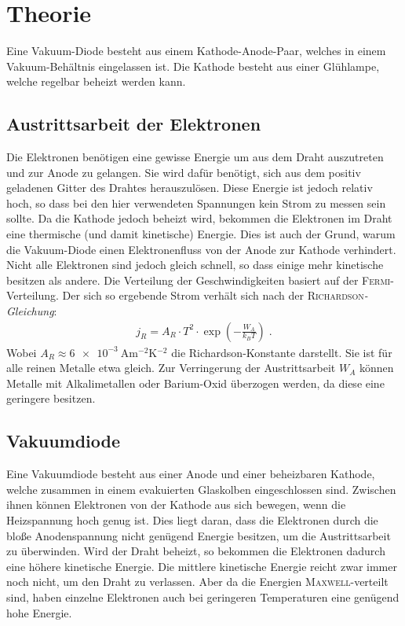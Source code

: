 \documentclass[12pt,a4paper,titlepage,headinclude,bibtotoc]{scrartcl}
\begin{document}
\cite{gerthsen}

\section{Theorie}
\label{sec:theorie}
Eine Vakuum-Diode besteht aus einem Kathode-Anode-Paar, welches in einem Vakuum-Behältnis eingelassen ist.
Die Kathode besteht aus einer Glühlampe, welche regelbar beheizt werden kann.
\subsection{Austrittsarbeit der Elektronen}
Die Elektronen benötigen eine gewisse Energie um aus dem Draht auszutreten und zur Anode zu gelangen.
Sie wird dafür benötigt, sich aus dem positiv geladenen Gitter des Drahtes herauszulösen.
Diese Energie ist jedoch relativ hoch, so dass bei den hier verwendeten Spannungen kein Strom zu messen sein sollte.
Da die Kathode jedoch beheizt wird, bekommen die Elektronen im Draht eine thermische (und damit kinetische) Energie.
Dies ist auch der Grund, warum die Vakuum-Diode einen Elektronenfluss von der Anode zur Kathode verhindert.
Nicht alle Elektronen sind jedoch gleich schnell, so dass einige mehr kinetische besitzen als andere.
Die Verteilung der Geschwindigkeiten basiert auf der \textsc{Fermi}-Verteilung.
Der sich so ergebende Strom verhält sich nach der \textsc{Richardson}\emph{-Gleichung}:
\begin{align}
	j_R=A_R\cdot T^{2}\cdot \exp\left(-\frac{W_A}{k_BT}\right)\label{eq:richardson}\; .
\end{align}
Wobei $A_R\approx \SI{6e-3}{\ampere\meter^{-2}\kelvin^{-2}}$ die Richardson-Konstante darstellt.
Sie ist für alle reinen Metalle etwa gleich.
Zur Verringerung der Austrittsarbeit $W_A$ können Metalle mit Alkalimetallen oder Barium-Oxid überzogen werden, da diese eine geringere besitzen.


                                                                                                                                                                      
\subsection{Vakuumdiode}
Eine Vakuumdiode besteht aus einer Anode und einer beheizbaren Kathode, welche zusammen in einem evakuierten Glaskolben eingeschlossen sind.
Zwischen ihnen können Elektronen von der Kathode aus sich bewegen, wenn die Heizspannung hoch genug ist.
Dies liegt daran, dass die Elektronen durch die bloße Anodenspannung nicht genügend Energie besitzen, um die Austrittsarbeit zu überwinden.
Wird der Draht beheizt, so bekommen die Elektronen dadurch eine höhere kinetische Energie.
Die mittlere kinetische Energie reicht zwar immer noch nicht, um den Draht zu verlassen.
Aber da die Energien \textsc{Maxwell}-verteilt sind, haben einzelne Elektronen auch bei geringeren Temperaturen eine genügend hohe Energie.\\
\end{document}
